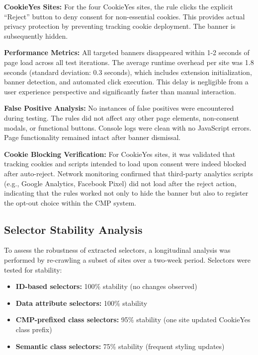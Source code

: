 \documentclass[conference]{IEEEtran}
\begin{document}
\textbf{CookieYes Sites:} For the four CookieYes sites, the rule clicks the explicit ``Reject'' button to deny consent for non-essential cookies. This provides actual privacy protection by preventing tracking cookie deployment. The banner is subsequently hidden.

\textbf{Performance Metrics:} All targeted banners disappeared within 1-2 seconds of page load across all test iterations. The average runtime overhead per site was 1.8 seconds (standard deviation: 0.3 seconds), which includes extension initialization, banner detection, and automated click execution. This delay is negligible from a user experience perspective and significantly faster than manual interaction.

\textbf{False Positive Analysis:} No instances of false positives were encountered during testing. The rules did not affect any other page elements, non-consent modals, or functional buttons. Console logs were clean with no JavaScript errors. Page functionality remained intact after banner dismissal.

\textbf{Cookie Blocking Verification:} For CookieYes sites, it was validated that tracking cookies and scripts intended to load upon consent were indeed blocked after auto-reject. Network monitoring confirmed that third-party analytics scripts (e.g., Google Analytics, Facebook Pixel) did not load after the reject action, indicating that the rules worked not only to hide the banner but also to register the opt-out choice within the CMP system.

\subsection{Selector Stability Analysis}

To assess the robustness of extracted selectors, a longitudinal analysis was performed by re-crawling a subset of sites over a two-week period. Selectors were tested for stability:

\begin{itemize}

    \item \textbf{ID-based selectors:} 100\% stability (no changes observed)

    \item \textbf{Data attribute selectors:} 100\% stability

    \item \textbf{CMP-prefixed class selectors:} 95\% stability (one site updated CookieYes class prefix)

    \item \textbf{Semantic class selectors:} 75\% stability (frequent styling updates)

\end{itemize}
\end{document}
